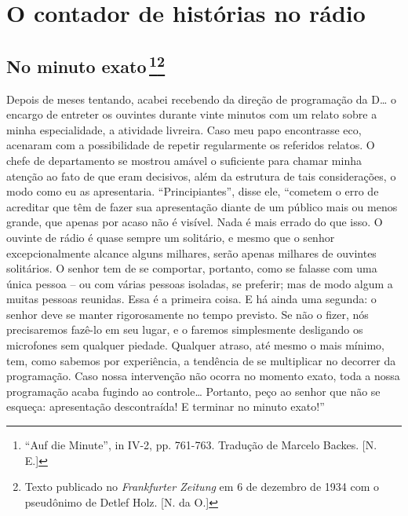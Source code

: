 


\part{O contador de histórias no rádio}

\chapter{No minuto exato\,\footnote{``Auf die Minute'', in  IV-2, pp. 761-763.
  Tradução de Marcelo Backes. [N. E.]}\footnote{Texto publicado
  no \emph{Frankfurter Zeitung} em 6 de dezembro de 1934 com o
  pseudônimo de Detlef Holz. [N. da O.]} }

Depois de meses tentando, acabei recebendo da direção de programação da
D\ldots{} o encargo de entreter os ouvintes durante vinte minutos com um
relato sobre a minha especialidade, a atividade livreira. Caso meu papo
encontrasse eco, acenaram com a possibilidade de repetir regularmente os
referidos relatos. O chefe de departamento se mostrou amável o
suficiente para chamar minha atenção ao fato de que eram decisivos, além
da estrutura de tais considerações, o modo como eu as apresentaria.
``Principiantes'', disse ele, ``cometem o erro de acreditar que têm de
fazer sua apresentação diante de um público mais ou menos grande, que
apenas por acaso não é visível. Nada é mais errado do que isso. O
ouvinte de rádio é quase sempre um solitário, e mesmo que o senhor
excepcionalmente alcance alguns milhares, serão apenas milhares de
ouvintes solitários. O senhor tem de se comportar, portanto, como se
falasse com uma única pessoa -- ou com várias pessoas isoladas, se
preferir; mas de modo algum a muitas pessoas reunidas. Essa é a primeira
coisa. E há ainda uma segunda: o senhor deve se manter rigorosamente no
tempo previsto. Se não o fizer, nós precisaremos fazê-lo em seu lugar, e
o faremos simplesmente desligando os microfones sem qualquer piedade.
Qualquer atraso, até mesmo o mais mínimo, tem, como sabemos por
experiência, a tendência de se multiplicar no decorrer da programação.
Caso nossa intervenção não ocorra no momento exato, toda a nossa
programação acaba fugindo ao controle\ldots{} Portanto, peço ao senhor que
não se esqueça: apresentação descontraída! E terminar no minuto exato!''


